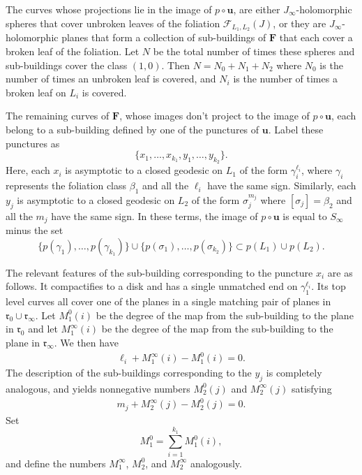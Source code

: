 \documentclass[12pt]{amsart}
\theoremstyle{definition}
\begin{document}
The curves whose projections lie in the image of $p\circ \mathbf{u}$, are either $J_\infty$-holomorphic spheres that cover unbroken leaves of the foliation $\mathcal{F}_{L_1,L_2}(J)$, or they are $J_\infty$-holomorphic planes that form a collection of sub-buildings  of $\mathbf{F}$ that each cover a broken leaf of the foliation. Let $N$ be the total number of times these spheres and sub-buildings cover the class $(1,0)$. Then $N=N_0+N_1 + N_2$ where $N_0$ is the number of times an unbroken leaf is covered, and $N_i$ is the number of times a broken leaf on $L_i$ is covered.

The remaining curves of $\mathbf{F}$, whose images don't project to the image of $p\circ \mathbf{u}$, each belong to a sub-building defined by one of the punctures of $\mathbf{u}$. Label these punctures as  $$\{x_1, \dots, x_{k_1}, y_1, \dots, y_{k_2}\}.$$ Here, each $x_i$ is asymptotic to a closed geodesic on $L_1$ of the form $\gamma_i^{\ell_i}$, where $\gamma_i$ represents the foliation class $\beta_1$ and all the $\ell_i$ have the same sign. Similarly, each $y_j$ is asymptotic to a closed geodesic on $L_2$ of the form $\sigma_j^{m_j}$ where $[\sigma_j]=\beta_2$ and all the $m_j$ have the same sign. In these terms, the image of $p\circ \mathbf{u}$ is equal to $S_\infty$ minus the set  $$\{p(\gamma_1), \dots, p(\gamma_{k_1})\}\cup\{ p(\sigma_1), \dots, p(\sigma_{k_2})\} \subset p(L_1) \cup p(L_2).$$ 

The relevant features of the sub-building corresponding to the puncture $x_i$ are as follows. It compactifies to a disk and has a single unmatched end on $\gamma_1^{\ell_i}$. Its top level curves all cover one of the planes in a single matching pair of planes in $\mathfrak{r}_0 \cup \mathfrak{r}_\infty$. Let $M^0_1(i)$ be the degree of the map from the sub-building to the plane in $\mathfrak{r}_0$ and let $M^\infty_1(i)$  be the degree of the map from the sub-building to the plane in $\mathfrak{r}_\infty.$ We then have 
\begin{align}
 \ell_i+M^{\infty}_1(i)-M^0_1(i)=0.   
\end{align}
The description of the sub-buildings corresponding to the $y_j$ is completely analogous, and yields nonnegative numbers $M^0_2(j)$ and $M^\infty_2(j)$ satisfying
\begin{align}
 m_j+M^{\infty}_2(j)-M^0_2(j)=0.   
\end{align} 
Set  $$M_1^0 = \sum_{i=1}^{k_1} M^0_1(i),$$ and define the numbers $M_1^\infty$, $M_2^0$, and $M_2^\infty$ analogously. 
\end{document}
